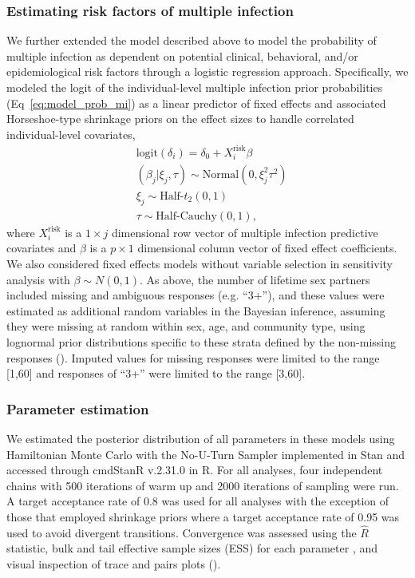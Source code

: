 \documentclass[10pt,letterpaper]{article}
\begin{document}
\subsubsection{Estimating risk factors of multiple infection}
\label{sec:extended_model}
We further extended the model described above to model the probability of multiple infection as dependent on potential clinical, behavioral, and/or epidemiological risk factors through a logistic regression approach. Specifically, we modeled the logit of the individual-level multiple infection prior probabilities (Eq~\ref{eq:model_prob_mi}) as a linear predictor of fixed effects and associated Horseshoe-type shrinkage priors\cite{carvalho2009, piironen2017} on the effect sizes to handle correlated individual-level covariates, 
\begin{subequations}
\label{eq:delta_i_covariates}
\begin{align}
&\text{logit}\left(\delta_i\right) = \delta_0 +  X^{\text{risk}}_i \beta\\
&(\beta_j | \xi_j,\tau) \sim \text{Normal}(0,\xi_j^2\tau^2)\\
&\xi_j \sim  \text{Half-}t_2(0, 1)\\
&\tau \sim \text{Half-Cauchy}(0,1),
\end{align}
\end{subequations}
where $X^{\text{risk}}_i$ is a $1 \times j$ dimensional row vector of multiple infection predictive covariates and $\beta$ is a $p \times 1$ dimensional column vector of fixed effect coefficients. We also considered fixed effects models without variable selection in sensitivity analysis with $\beta \sim N(0,1)$.
%
As above, the number of lifetime sex partners included missing and ambiguous responses (e.g. ``3+''), and these values were estimated as additional random variables in the Bayesian inference, assuming they were missing at random within sex, age, and community type, using lognormal prior distributions specific to these strata defined by the non-missing responses (). Imputed values for missing responses were limited to the range [1,60] and responses of ``3+'' were limited to the range [3,60].  
\par

\subsubsection{Parameter estimation}
We estimated the posterior distribution of all parameters in these models using Hamiltonian Monte Carlo \cite{betancourt2013} with the No-U-Turn Sampler \cite{hoffman2014} implemented in Stan \cite{stan2024} and accessed through cmdStanR v.2.31.0 \cite{gabry2023} in R. For all analyses, four independent chains with 500 iterations of warm up and 2000 iterations of sampling were run. A target acceptance rate of 0.8 was used for all analyses with the exception of those that employed shrinkage priors where a target acceptance rate of 0.95 was used to avoid divergent transitions. Convergence was assessed using the $\hat{R}$ statistic, bulk and tail effective sample sizes (ESS) for each parameter \cite{vehtari2021}, and visual inspection of trace and pairs plots (). \par
\end{document}
